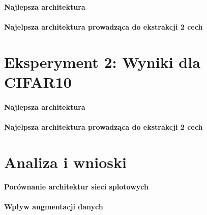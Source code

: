 \documentclass[10pt]{article}
\begin{document}
\paragraph{Najlepsza architektura}
\paragraph{Najelpsza architektura prowadząca do ekstrakcji 2 cech}

\pagebreak
\section{Eksperyment 2: Wyniki dla CIFAR10}\label{sec:ex2_cifar}

\paragraph{Najlepsza architektura}
\paragraph{Najelpsza architektura prowadząca do ekstrakcji 2 cech}

\pagebreak
\section{Analiza i wnioski}\label{sec:wyniki}

\paragraph{Porównanie architektur sieci splotowych}

\paragraph{Wpływ augmentacji danych}
\end{document}
